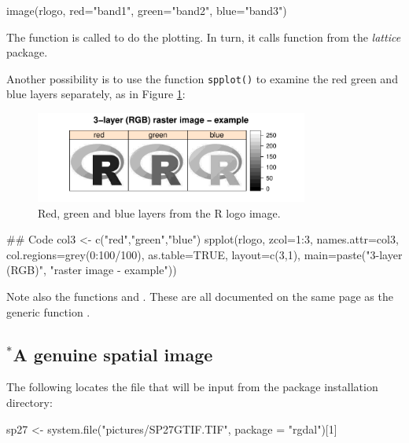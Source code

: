 \begin{Schunk}
\begin{Sinput}
image(rlogo, red="band1",
      green="band2",
      blue="band3")
\end{Sinput}
\end{Schunk}
\noindent
The function  is called to do the plotting.
In turn, it calls function  from the
{\em lattice} package.

Another possibility is to use the function \texttt{spplot()}
  to examine the red green and blue layers separately, as in Figure
  \ref{fig:rlogo3}:
\begin{figure}
\begin{Schunk}


\centerline{\includegraphics[width=0.8\textwidth]{figs/10-spplot-col3-1} }

\end{Schunk}
\caption{Red, green and blue layers from the R logo image.\label{fig:rlogo3}}
\end{figure}
\begin{Schunk}
\begin{Sinput}
## Code
col3 <- c("red","green","blue")
spplot(rlogo, zcol=1:3, names.attr=col3,
       col.regions=grey(0:100/100), as.table=TRUE,
       layout=c(3,1), main=paste("3-layer (RGB)",
       "raster image - example"))
\end{Sinput}
\end{Schunk}

  Note also the functions  and
  .  These are all documented on the same page
  as the generic function .

\subsection*{$^*$A genuine spatial image}

The following locates the file that will be input
from the package installation directory:
\begin{Schunk}
\begin{Sinput}
sp27 <- system.file("pictures/SP27GTIF.TIF",
                    package = "rgdal")[1]
\end{Sinput}
\end{Schunk}

